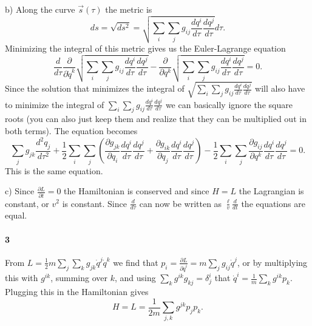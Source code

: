 \documentclass[letterpaper,11pt]{article}
\begin{document}
b) Along the curve $\vec{s}(\tau)$ the metric is
$$ds = \sqrt{ds^2} = \sqrt{\sum_i \sum_j g_{ij} \frac{dq^i}{d\tau} \frac{dq^j}{d\tau}} d\tau.$$
Minimizing the integral of this metric gives us the Euler-Lagrange equation
$$\frac{d}{d\tau} \frac{\partial}{\partial \dot{q}^k} \sqrt{\sum_i \sum_j g_{ij} \frac{dq^i}{d\tau} \frac{dq^j}{d\tau}} - \frac{\partial}{\partial q^k} \sqrt{\sum_i \sum_j g_{ij} \frac{dq^i}{d\tau} \frac{dq^j}{d\tau}} = 0.$$
Since the solution that minimizes the integral of $\sqrt{\sum_i \sum_j g_{ij} \frac{dq^i}{d\tau} \frac{dq^j}{d\tau}}$ will also have to minimize the integral of $\sum_i \sum_j g_{ij} \frac{dq^i}{d\tau} \frac{dq^j}{d\tau}$ we can basically ignore the square roots (you can also just keep them and realize that they can be multiplied out in both terms).  The equation becomes
\begin{equation*}
 \sum_j g_{jk} \frac{d^2 q_j}{d\tau^2} + \frac{1}{2} \sum_i \sum_j \left( \frac{\partial g_{jk}}{\partial q_i} \frac{d q^i}{d\tau} \frac{dq^j}{d\tau} + \frac{\partial g_{ik}}{\partial q_j} \frac{d q^i}{d\tau} \frac{dq^j}{d\tau} \right) - \frac{1}{2} \sum_i \sum_j \frac{\partial g_{ij}}{\partial q^k} \frac{dq^i}{d\tau} \frac{dq^j}{d\tau} = 0.
\end{equation*}
This is the same equation.

c) Since $\frac{\partial L}{\partial t} = 0$ the Hamiltonian is conserved and since $H = L$ the Lagrangian is constant, or $v^2$ is constant.  Since $\frac{d}{d\tau}$ can now be written as $\frac{\ell}{v} \frac{d}{dt}$ the equations are equal.



\paragraph*{3}

From $L = \frac{1}{2} m \sum_j \sum_k g_{jk} \dot{q}^j \dot{q}^k$ we find that $p_i = \frac{\partial L}{\partial \dot{q}^i} = m \sum_j g_{ij} \dot{q}^j$, or by multiplying this with $g^{ik}$, summing over $k$, and using $\sum_k g^{ik} g_{kj} = \delta^i_j$ that $\dot{q}^i = \frac{1}{m} \sum_k g^{ik} p_k$.  Plugging this in the Hamiltonian gives $$H = L = \frac{1}{2m} \sum_{j,k} g^{jk} p_j p_k.$$
\end{document}

